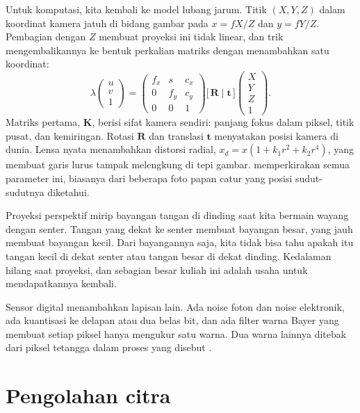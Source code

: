 Untuk komputasi, kita kembali ke model lubang jarum. Titik $(X,Y,Z)$ dalam koordinat kamera
jatuh di bidang gambar pada $x=fX/Z$ dan $y=fY/Z$. Pembagian dengan $Z$ membuat proyeksi ini
tidak linear, dan trik  mengembalikannya ke bentuk perkalian matriks
dengan menambahkan satu koordinat:
\begin{equation}
\lambda\begin{pmatrix}u\\v\\1\end{pmatrix}=\begin{pmatrix}f_x&s&c_x\\0&f_y&c_y\\0&0&1\end{pmatrix}
\big[\,\bm R\mid\bm t\,\big]\begin{pmatrix}X\\Y\\Z\\1\end{pmatrix}.
\label{eq:kamera}
\end{equation}
Matriks pertama, $\bm K$, berisi sifat kamera sendiri: panjang fokus dalam piksel, titik pusat,
dan kemiringan. Rotasi $\bm R$ dan translasi $\bm t$ menyatakan posisi kamera di dunia. Lensa
nyata menambahkan distorsi radial, $x_d=x(1+k_1r^2+k_2r^4)$, yang membuat garis lurus tampak
melengkung di tepi gambar.  memperkirakan semua parameter ini, biasanya
dari beberapa foto papan catur yang posisi sudut-sudutnya diketahui.

Proyeksi perspektif mirip bayangan tangan di dinding saat kita bermain wayang dengan senter.
Tangan yang dekat ke senter membuat bayangan besar, yang jauh membuat bayangan kecil. Dari
bayangannya saja, kita tidak bisa tahu apakah itu tangan kecil di dekat senter atau tangan
besar di dekat dinding. Kedalaman hilang saat proyeksi, dan sebagian besar kuliah ini adalah
usaha untuk mendapatkannya kembali.

Sensor digital menambahkan lapisan lain. Ada noise foton dan noise elektronik, ada kuantisasi ke
delapan atau dua belas bit, dan ada filter warna Bayer yang membuat setiap piksel hanya mengukur
satu warna. Dua warna lainnya ditebak dari piksel tetangga dalam proses yang disebut
.

\section{Pengolahan citra}

